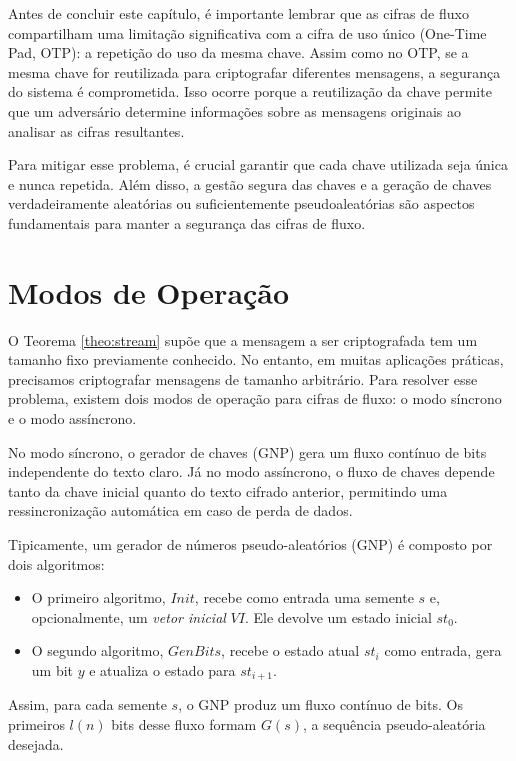Antes de concluir este capítulo, é importante lembrar que as cifras de fluxo compartilham uma limitação significativa com a cifra de uso único (One-Time Pad, OTP):
a repetição do uso da mesma chave.
Assim como no OTP, se a mesma chave for reutilizada para criptografar diferentes mensagens, a segurança do sistema é comprometida.
Isso ocorre porque a reutilização da chave permite que um adversário determine informações sobre as mensagens originais ao analisar as cifras resultantes.

Para mitigar esse problema, é crucial garantir que cada chave utilizada seja única e nunca repetida.
Além disso, a gestão segura das chaves e a geração de chaves verdadeiramente aleatórias ou suficientemente pseudoaleatórias são aspectos fundamentais para manter a segurança das cifras de fluxo.

\section{Modos de Operação}
\label{sec:modos-de-operacao}

O Teorema \ref{theo:stream} supõe que a mensagem a ser criptografada tem um tamanho fixo previamente conhecido.
No entanto, em muitas aplicações práticas, precisamos criptografar mensagens de tamanho arbitrário.
Para resolver esse problema, existem dois modos de operação para cifras de fluxo: o modo síncrono e o modo assíncrono.

No modo síncrono, o gerador de chaves (GNP) gera um fluxo contínuo de bits independente do texto claro.
Já no modo assíncrono, o fluxo de chaves depende tanto da chave inicial quanto do texto cifrado anterior, permitindo uma ressincronização automática em caso de perda de dados.

Tipicamente, um gerador de números pseudo-aleatórios (GNP) é composto por dois algoritmos: 
\begin{itemize}
\item O primeiro algoritmo, $Init$, recebe como entrada uma semente $s$ e, opcionalmente, um {\em vetor inicial} $VI$.
  Ele devolve um estado inicial $st_0$.
\item  O segundo algoritmo, $GenBits$, recebe o estado atual $st_i$ como entrada, gera um bit $y$ e atualiza o estado para $st_{i+1}$.
\end{itemize}

Assim, para cada semente $s$, o GNP produz um fluxo contínuo de bits.
Os primeiros $l(n)$ bits desse fluxo formam $G(s)$, a sequência pseudo-aleatória desejada.

